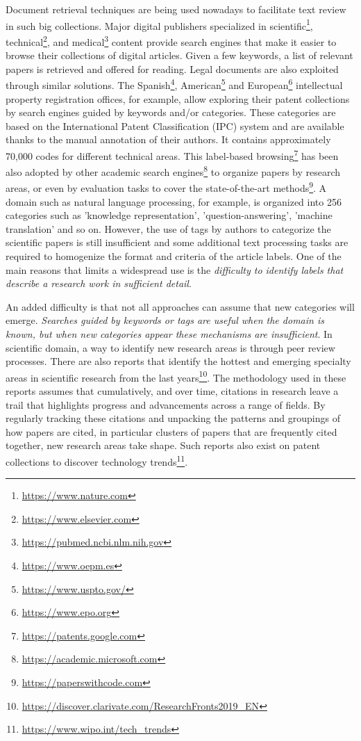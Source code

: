 Document retrieval techniques are being used nowadays to facilitate text review in such big collections. Major digital publishers specialized in scientific\footnote{\url{https://www.nature.com}}, technical\footnote{\url{https://www.elsevier.com}}, and medical\footnote{\url{https://pubmed.ncbi.nlm.nih.gov}} content provide search engines that make it easier to browse their collections of digital articles. Given a few keywords, a list of relevant papers is retrieved and offered for reading. Legal documents are also exploited through similar solutions. The Spanish\footnote{\url{https://www.oepm.es}}, American\footnote{\url{https://www.uspto.gov/}} and European\footnote{\url{https://www.epo.org}} intellectual property registration offices, for example, allow exploring their patent collections by search engines guided by keywords and/or categories. These categories are based on the International Patent Classification (IPC) system and are available thanks to the manual annotation of their authors. It contains approximately 70,000 codes for different technical areas. This label-based browsing\footnote{\url{https://patents.google.com}} has been also adopted by other academic search engines\footnote{\url{https://academic.microsoft.com}} to organize papers by research areas, or even by evaluation tasks to cover the state-of-the-art methods\footnote{\url{https://paperswithcode.com}}. A domain such as natural language processing, for example, is organized into 256 categories such as 'knowledge representation', 'question-answering', 'machine translation' and so on. However, the use of tags by authors to categorize the scientific papers is still insufficient and some additional text processing tasks are required to homogenize the format and criteria of the article labels. One of the main reasons that limits a widespread use is the \textit{difficulty to identify labels that describe a research work in sufficient detail}.

An added difficulty is that not all approaches can assume that new categories will emerge. \textit{Searches guided by keywords or tags are useful when the domain is known, but when new categories appear these mechanisms are insufficient}. In scientific domain, a way to identify new research areas is through peer review processes. There are also reports that identify the hottest and emerging specialty areas in scientific research from the last years\footnote{\url{https://discover.clarivate.com/ResearchFronts2019_EN}}. The methodology used in these reports assumes that cumulatively, and over time, citations in research leave a trail that highlights progress and advancements across a range of fields. By regularly tracking these citations and unpacking the patterns and groupings of how papers are cited, in particular clusters of papers that are frequently cited together, new research areas take shape. Such reports also exist on patent collections to discover technology trends\footnote{\url{https://www.wipo.int/tech_trends}}.

